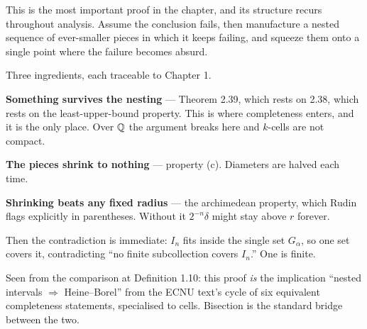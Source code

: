 \begin{unpack}
This is the most important proof in the chapter, and its structure recurs
throughout analysis. Assume the conclusion fails, then manufacture a nested
sequence of ever-smaller pieces in which it keeps failing, and squeeze them
onto a single point where the failure becomes absurd.

\medskip
\begin{center}
\end{center}

\smallskip
Three ingredients, each traceable to Chapter 1.

\smallskip
\textbf{Something survives the nesting} --- Theorem 2.39, which rests on 2.38,
which rests on the least-upper-bound property. This is where completeness
enters, and it is the only place. Over $\mathbb{Q}$ the argument breaks here and
$k$-cells are not compact.

\smallskip
\textbf{The pieces shrink to nothing} --- property (c). Diameters are halved
each time.

\smallskip
\textbf{Shrinking beats any fixed radius} --- the archimedean property, which
Rudin flags explicitly in parentheses. Without it $2^{-n}\delta$ might stay
above $r$ forever.

\smallskip
Then the contradiction is immediate: $I_n$ fits inside the single set
$G_\alpha$, so one set covers it, contradicting ``no finite subcollection
covers $I_n$.'' One is finite.

\smallskip
Seen from the comparison at Definition 1.10: this proof \emph{is} the
implication ``nested intervals $\Rightarrow$ Heine--Borel'' from the ECNU
text's cycle of six equivalent completeness statements, specialised to cells.
Bisection is the standard bridge between the two.
\end{unpack}

